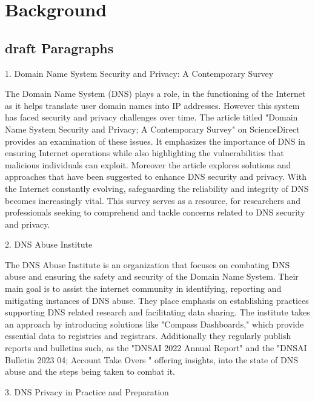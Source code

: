 \chapter{Background}
\label{Chapt2}
\section{draft Paragraphs}
1. Domain Name System Security and Privacy: A Contemporary Survey

The Domain Name System (DNS) plays a role, in the functioning of the Internet as it helps translate user domain names into IP addresses. However this system has faced security and privacy challenges over time. The article titled "Domain Name System Security and Privacy; A Contemporary Survey" on ScienceDirect provides an examination of these issues. It emphasizes the importance of DNS in ensuring Internet operations while also highlighting the vulnerabilities that malicious individuals can exploit. Moreover the article explores solutions and approaches that have been suggested to enhance DNS security and privacy. With the Internet constantly evolving, safeguarding the reliability and integrity of DNS becomes increasingly vital.\cite{sciencedirect2023dns}  This survey serves as a resource, for researchers and professionals seeking to comprehend and tackle concerns related to DNS security and privacy.


2. DNS Abuse Institute

The DNS Abuse Institute is an organization that focuses on combating DNS abuse and ensuring the safety and security of the Domain Name System. Their main goal is to assist the internet community in identifying, reporting and mitigating instances of DNS abuse. They place emphasis on establishing practices supporting DNS related research and facilitating data sharing. \cite{dnsabuseinstitute2023} The institute takes an approach by introducing solutions like "Compass Dashboards," which provide essential data to registries and registrars. Additionally they regularly publish reports and bulletins such, as the "DNSAI 2022 Annual Report" and the "DNSAI Bulletin 2023 04; Account Take Overs " offering insights, into the state of DNS abuse and the steps being taken to combat it.


3. DNS Privacy in Practice and Preparation



